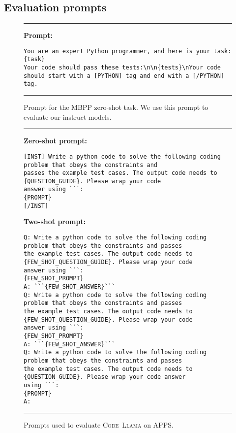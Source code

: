\documentclass[10pt]{article}
\newcommand{\model}{\textsc{Code~Llama}\xspace}
\begin{document}
\subsection{Evaluation prompts}

\begin{figure}[h!]
\scriptsize
\noindent\rule{\textwidth}{1pt}
   \textbf{Prompt:} 
\begin{verbatim}
You are an expert Python programmer, and here is your task: {task} 
Your code should pass these tests:\n\n{tests}\nYour code should start with a [PYTHON] tag and end with a [/PYTHON] tag.
\end{verbatim}

\noindent\rule{\textwidth}{1pt}

\caption{Prompt for the MBPP zero-shot task. We use this prompt to evaluate our instruct models. 
\label{fig:mbpp_zero_prompt}}
\end{figure}

\begin{figure}[h!]
\small
\noindent\rule{\textwidth}{1pt}
\textbf{Zero-shot prompt:}
\begin{verbatim}
[INST] Write a python code to solve the following coding problem that obeys the constraints and 
passes the example test cases. The output code needs to {QUESTION_GUIDE}. Please wrap your code 
answer using ```:
{PROMPT}
[/INST]
\end{verbatim}

\textbf{Two-shot prompt:} 
\begin{verbatim}
Q: Write a python code to solve the following coding problem that obeys the constraints and passes 
the example test cases. The output code needs to {FEW_SHOT_QUESTION_GUIDE}. Please wrap your code 
answer using ```:
{FEW_SHOT_PROMPT}
A: ```{FEW_SHOT_ANSWER}```
Q: Write a python code to solve the following coding problem that obeys the constraints and passes 
the example test cases. The output code needs to {FEW_SHOT_QUESTION_GUIDE}. Please wrap your code 
answer using ```:
{FEW_SHOT_PROMPT}
A: ```{FEW_SHOT_ANSWER}```
Q: Write a python code to solve the following coding problem that obeys the constraints and passes 
the example test cases. The output code needs to {QUESTION_GUIDE}. Please wrap your code answer 
using ```:
{PROMPT}
A: 
\end{verbatim}
\noindent\rule{\textwidth}{1pt}
\caption{Prompts used to evaluate \model on APPS.\label{fig:prompt_for_apps}}
\end{figure}

\clearpage 
\end{document}

